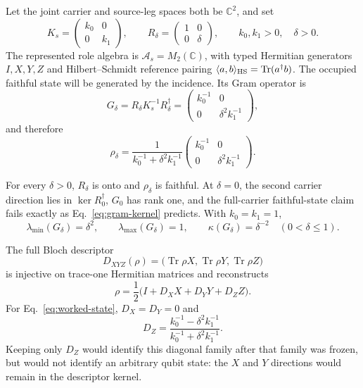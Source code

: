 \documentclass[11pt]{article}
\newcommand{\Tr}{\operatorname{Tr}}
\begin{document}
Let the joint carrier and source-leg spaces both be \(\mathbb C^2\), and set
\begin{equation}
 K_s=\begin{pmatrix}k_0&0\\0&k_1\end{pmatrix},
 \qquad
 R_\delta=\begin{pmatrix}1&0\\0&\delta\end{pmatrix},
 \qquad k_0,k_1>0,\quad\delta>0.
 \label{eq:worked-source-data}
\end{equation}
The represented role algebra is \(\mathcal A_s=M_2(\mathbb C)\), with typed
Hermitian generators \(I,X,Y,Z\) and Hilbert--Schmidt reference pairing
\(\langle a,b\rangle_{\rm HS}=\Tr(a^\dagger b)\).  The occupied faithful
state will be generated by the incidence.  Its Gram operator is
\begin{equation}
 G_\delta=R_\delta K_s^{-1}R_\delta^\dagger
 =\begin{pmatrix}k_0^{-1}&0\\0&\delta^2k_1^{-1}\end{pmatrix},
 \label{eq:worked-gram}
\end{equation}
and therefore
\begin{equation}
 \rho_\delta=
 \frac{1}{k_0^{-1}+\delta^2k_1^{-1}}
 \begin{pmatrix}k_0^{-1}&0\\0&\delta^2k_1^{-1}\end{pmatrix}.
 \label{eq:worked-state}
\end{equation}

For every \(\delta>0\), \(R_\delta\) is onto and \(\rho_\delta\) is faithful.
At \(\delta=0\), the second carrier direction lies in
\(\ker R_0^\dagger\), \(G_0\) has rank one, and the full-carrier faithful-state
claim fails exactly as Eq.~\eqref{eq:gram-kernel} predicts.  With \(k_0=k_1=1\),
\begin{equation}
 \lambda_{\min}(G_\delta)=\delta^2,
 \qquad
 \lambda_{\max}(G_\delta)=1,
 \qquad
 \kappa(G_\delta)=\delta^{-2}
 \quad(0<\delta\le1).
 \label{eq:worked-conditioning}
\end{equation}

The full Bloch descriptor
\begin{equation}
 D_{XYZ}(\rho)=
 \bigl(\Tr\rho X,\Tr\rho Y,\Tr\rho Z\bigr)
 \label{eq:bloch-descriptor}
\end{equation}
is injective on trace-one Hermitian matrices and reconstructs
\begin{equation}
 \rho=\frac{1}{2}\bigl(I+D_X X+D_Y Y+D_Z Z\bigr).
 \label{eq:bloch-reconstruction}
\end{equation}
For Eq.~\eqref{eq:worked-state}, \(D_X=D_Y=0\) and
\begin{equation}
 D_Z=\frac{k_0^{-1}-\delta^2k_1^{-1}}{k_0^{-1}+\delta^2k_1^{-1}}.
 \label{eq:worked-bloch-z}
\end{equation}
Keeping only \(D_Z\) would identify this diagonal family after that family was
frozen, but would not identify an arbitrary qubit state: the \(X\) and \(Y\)
directions would remain in the descriptor kernel.
\end{document}

